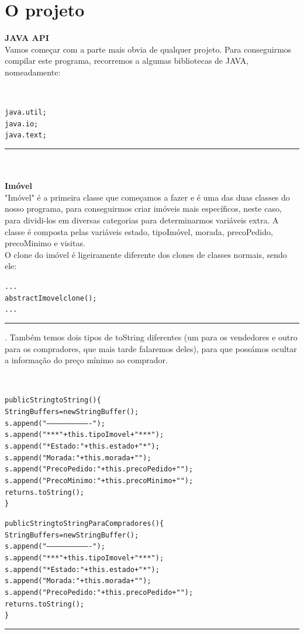 \documentclass[10pt]{article}
\newenvironment{code}                    
{\textbf{
} \hspace{1cm} \hrulefill \\ 
\smallskip 
\begin{center}
\begin{minipage}{0.9\textwidth} 
\begin{alltt}\small}
{\end{alltt}
\end{minipage}
\end{center}
\hrule\smallskip
}
\begin{document}

\pagebreak

\section{O projeto}
\textbf{JAVA API}
\\ 
Vamos começar com a parte mais obvia de qualquer projeto.
Para conseguirmos compilar este programa, recorremos a algumas bibliotecas de JAVA, nomeadamente:

\begin{code}
java.util;
java.io;
java.text;

\end{code}


\textbf{\\ \\Imóvel}
\\

"Imóvel" é a primeira classe que começamos a fazer e é uma das duas classes do nosso programa, para conseguirmos criar imóveis mais específicos, neste caso, para dividi-los em diversas categorias para determinarmos variáveis extra. A classe é composta pelas variáveis estado, tipoImóvel, morada, precoPedido, precoMinimo e visitas. 
\\
O clone do imóvel é ligeiramente diferente dos clones de classes normais, sendo ele:
\begin{code}
...
 abstract Imovel clone();
...
\end{code}
.
\linebreak
Também temos dois tipos de toString diferentes (um para os vendedores e outro para os compradores, que mais tarde falaremos deles), para que possámos ocultar a informação do preço mínimo ao comprador.

\begin{code}
public String toString()\{
        StringBuffer s = new StringBuffer();
        s.append("\n-------------------------------\n");
        s.append(" *** "+this.tipoImovel+" ***\n ");
        s.append(" * Estado: "+this.estado+" *\n");
        s.append("Morada: "+this.morada+"\n");
        s.append("Preco Pedido: "+this.precoPedido+"\n");
        s.append("Preco Minimo: "+this.precoMinimo+"\n");
        return s.toString();
    \}
    
    public String toStringParaCompradores()\{
        StringBuffer s = new StringBuffer();
        s.append("\n-------------------------------\n");
        s.append(" *** "+this.tipoImovel+" ***\n ");
        s.append(" * Estado: "+this.estado+" *\n");
        s.append("Morada: "+this.morada+"\n");
        s.append("Preco Pedido: "+this.precoPedido+"\n");
        return s.toString();
    \}
\end{code}
\end{document}

